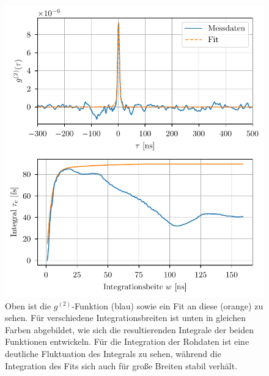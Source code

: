 \begin{figure}[H]
    \centering
    \includegraphics{images/Analysis/integration_different_width.pdf}
    \caption{Oben ist die $g^{(2)}$-Funktion (blau) sowie ein Fit an diese (orange) zu sehen. Für verschiedene Integrationsbreiten ist unten in gleichen Farben abgebildet, wie sich die resultierenden Integrale der beiden Funktionen entwickeln. Für die Integration der Rohdaten ist eine deutliche Fluktuation des Integrals zu sehen, während die Integration des Fits sich auch für große Breiten stabil verhält.}
    \label{fig:integration verschiedene Breiten}
\end{figure}

